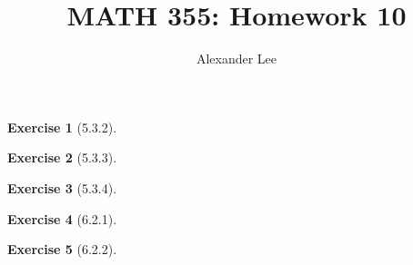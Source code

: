 \documentclass{amsart}
\title{MATH 355: Homework 10}
\author{Alexander Lee}
\theoremstyle{definition}
\newtheorem{exercise}{Exercise}
\begin{document}
\maketitle

\begin{exercise}[5.3.2]
\end{exercise}

\begin{exercise}[5.3.3]
\end{exercise}

\begin{exercise}[5.3.4]
\end{exercise}

\begin{exercise}[6.2.1]
\end{exercise}

\begin{exercise}[6.2.2]
\end{exercise}
\end{document}
